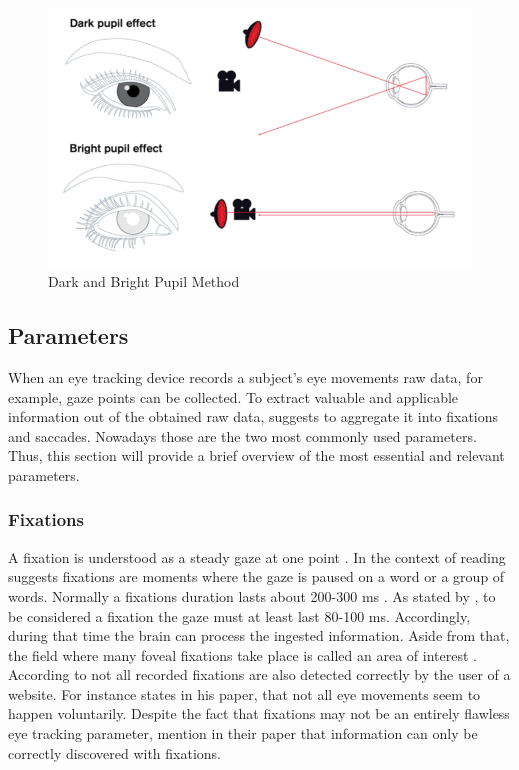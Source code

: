 \begin{figure}[!ht]
    \centering
    \includegraphics[width=1\linewidth]{images/DarkBright.png}
    \caption{
        Dark and Bright Pupil Method \autocite[]{tobii2018dark}
    }
    \label{figure:DarkBright}
\end{figure}


\subsection{Parameters}
\label{subsection:Parameters}
When an eye tracking device records a subject's eye movements raw data, for example, gaze points can be collected. To extract valuable and applicable information out of the obtained raw data, \textcite[]{blascheck2014state}  suggests to aggregate it into fixations and saccades. 
Nowadays those are the two most commonly used parameters.
Thus, this section will provide a brief overview of the most essential and relevant parameters.

\subsubsection{Fixations}
A fixation is understood as a steady gaze at one point \autocite[]{buscher2009you}.  In the context of reading \textcite[]{beymer2007eye} suggests fixations are moments where the gaze is paused on a word or a group of words. 
Normally a fixations duration lasts about 200-300 ms \autocite[]{kasneci2015online}. As stated by \textcite[]{buscher2009you}, to be considered a fixation the gaze must at least last 80-100 ms. Accordingly, during that time the brain can process the ingested information. Aside from that, the field where many foveal fixations take place is called an area of interest \autocite[]{djamasbi2014eye}.\\
According to \textcite[]{grzyb2016eye} not all recorded fixations are also detected correctly by the user of a website. For instance \textcite[]{bruneau2002eyes} states in his paper, that not all eye movements seem to happen voluntarily. 
Despite the fact that fixations may not be an entirely flawless eye tracking parameter, \textcite[]{biedert2010eyebook} mention in their paper that information can only be correctly discovered with fixations.

